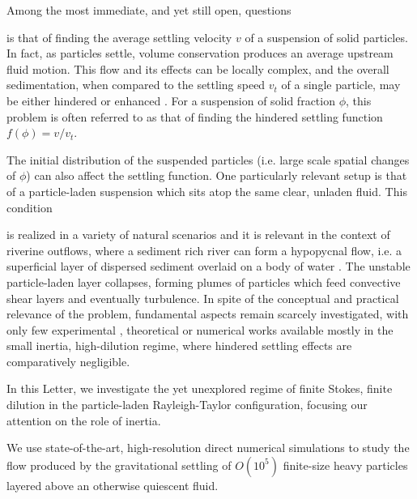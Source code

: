 \documentclass[aps,prl,twocolumn,showpacs,longbibliography]{revtex4-1}
\begin{document}
Among the most immediate, and yet still open, questions

is that of finding the average settling velocity $v$ of a suspension of solid particles. In fact, as particles settle, volume conservation produces an average upstream fluid motion.
This flow and its effects can be locally complex, and the overall sedimentation, when compared to the settling speed $v_t$ of a single particle, may be either hindered \cite{richardson1954sedimentation,batchelor1972,guazzelli2011physical} or enhanced \cite{huisman2016columnar}. For a suspension of solid fraction $\phi$, this problem is often referred to as that of finding the hindered settling function $f(\phi)=v/v_t$.










The initial distribution of the suspended particles (i.e. large scale spatial changes of $\phi$) can also affect the settling function.
One particularly relevant setup is that of a particle-laden suspension which sits atop the same clear, unladen fluid.
This condition

is realized in a variety of natural
scenarios \cite{remington-arnett-ea1999,michioka2005instability,green1995plankton} and it is
relevant in the context of riverine outflows, where a sediment rich river can
form a hypopycnal flow, i.e. a superficial layer of dispersed sediment overlaid
on a body of water \cite{wells-dorrell2021,parsons-bush-ea2001}. The unstable
particle-laden layer collapses, forming plumes of particles which feed
convective shear layers and eventually turbulence.
In spite of the conceptual and practical relevance of the problem, fundamental
aspects remain scarcely investigated, with only few experimental
\cite{voltz-pesch-ea2001}, theoretical \cite{burns-meiburg2012} or numerical
\cite{chou-wu-ea2014,burns-meiburg2015,yu-hsu-ea2014,magnani-musacchio-ea2021}
works available mostly in the small inertia, high-dilution regime, where hindered settling effects are comparatively negligible.

In this Letter, we investigate the yet unexplored regime of finite Stokes, finite dilution in the particle-laden Rayleigh-Taylor configuration, focusing our attention on the role of inertia.

We use state-of-the-art, high-resolution direct numerical simulations to study the flow produced by the gravitational settling of $O(10^5)$ finite-size heavy particles layered above an otherwise quiescent fluid.
\end{document}
